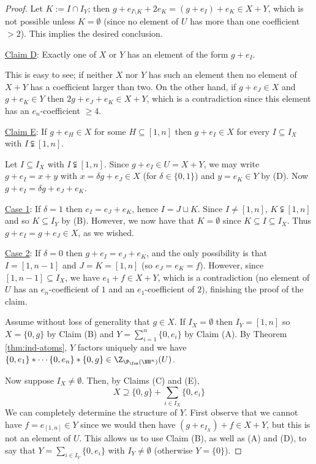 \begin{proof}
	Let $K := I\cap I_Y$; then $g + e_{I\setminus K} + 2e_K = (g+e_I) + e_K \in X+Y$, which is not possible unless $K=\emptyset$ (since no element of $U$ has more than one coefficient $>2$).
	This implies the desired conclusion.
	
	\noindent\underline{Claim D}: Exactly one of $X$ or $Y$ has an element of the form $g + e_I$. 
	
	This is easy to see; if neither $X$ nor $Y$ has such an element then no element of $X+Y$ has a coefficient larger than two.
	On the other hand, if $g+e_J\in X$ and $g+e_K\in Y$ then $2g + e_J + e_K \in X+Y$, which is a contradiction since this element has an $e_n$-coefficient $\ge 4$.
	
	\noindent\underline{Claim E}: If $g+ e_H\in X$ for some $H\subseteq [ 1,n ]$ then $g + e_I \in X$ for every $I\subseteq I_X$ with $I\subsetneqq [ 1,n]$. 
	
	Let $I \subseteq I_X$ with $I\subsetneqq [1,n]$.
	Since $g+e_I\in U = X+Y$, we may write $g+e_I = x +y$ with $x = \delta g + e_J\in X$ (for $\delta\in \{0,1\}$) and $y=e_K\in Y$ by (D).
	Now $g + e_I = \delta g + e_J + e_K$.
	
	\underline{Case 1}: If $\delta = 1$ then $e_I = e_J + e_K$, hence $I = J\sqcup K$. 
		Since $I\neq [1,n]$, $K\subsetneqq [ 1,n ]$ and so $K\subseteq I_Y$ by (B).
		However, we now have that $K = \emptyset$ since $K\subseteq I \subseteq I_X$.
		Thus $g + e_I = g + e_J \in X$, as we wished.
	
	\underline{Case 2}: If $\delta = 0$ then $g + e_I = e_J + e_K$, and the only possibility is that $I = [ 1,n-1]$ and $J = K = [ 1,n]$ (so $e_J = e_K = f$).
		However, since $[ 1,n-1 ] \subseteq I_X$, we have $e_1 + f \in X+Y$, which is a contradiction (no element of $U$ has an $e_n$-coefficient of $1$ and an $e_1$-coefficient of $2$), finishing the proof of the claim.
	
	Assume without loss of generality that $g\in X$.
	If $I_X = \emptyset$ then $I_Y = [1,n]$ so $X = \{0,g\}$ by Claim (B) and $Y = \sum_{i=1}^n \{0,e_i\}$ by Claim (A).
	By Theorem \ref{thm:ind-atoms}, $Y$ factors uniquely and we have $\{0,e_1\}*\cdots \{0,e_n\}*\{0,g\}\in \Z_{\P_\fon(\NN^n)}(U)$.
	
	Now suppose $I_X \neq \emptyset$.
	Then, by Claims (C) and (E), 
	\[X \supseteq \{0,g\} + \sum_{i\in I_X} \{0,e_i\} \tag{1} \label{factor-includes} \]
	We can completely determine the structure of $Y$.
	First observe that we cannot have $f=e_{[1,n]}\in Y$ since we would then have $(g+e_{I_X})+f \in X+Y$, but this is not an element of $U$.
	This allows us to use Claim (B), as well as (A) and (D), to say that $Y = \sum_{i\in I_Y} \{0,e_i\}$ with $I_Y\neq\emptyset$ (otherwise $Y=\{0\}$).
	

\end{proof}

